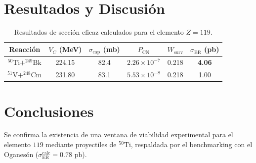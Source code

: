 \documentclass[twocolumn,aps,prc,preprintnumbers,fontsize=10pt,floatfix]{revtex4-1}
\begin{document}
\section{Resultados y Discusi\'on}
\begin{table}[h!]
\caption{Resultados de secci\'on eficaz calculados para el elemento $Z=119$.}
\centering
\begin{tabular}{cccccc}
\hline\hline
Reacci\'on & $V_C$ (MeV) & $\sigma_{\text{cap}}$ (mb) & $P_{\text{CN}}$ & $W_{\text{surv}}$ & $\sigma_{\text{ER}}$ (pb) \\
\hline
$^{50}\text{Ti} + ^{249}\text{Bk}$ & 224.15 & 82.4 & $2.26\times 10^{-7}$ & 0.218 & \textbf{4.06} \\
$^{51}\text{V} + ^{248}\text{Cm}$ & 231.80 & 83.1 & $5.53\times 10^{-8}$ & 0.218 & 1.00 \\
\hline\hline
\end{tabular}
\end{table}

\section{Conclusiones}
Se confirma la existencia de una ventana de viabilidad experimental para el elemento $119$ mediante proyectiles de $^{50}\text{Ti}$, respaldada por el benchmarking con el Oganes\'on ($\sigma_{\text{ER}}^{\text{calc}} = 0.78\text{ pb}$).
\end{document}
